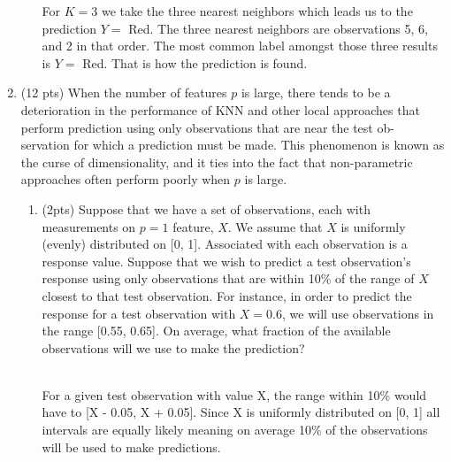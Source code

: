 \documentclass[a4paper]{article}
\theoremstyle{definition}
\newenvironment{soln}{
    \leavevmode\color{blue}\ignorespaces
}{}
\begin{document}
\begin{enumerate}
\begin{enumerate}
	\begin{soln}
            For $K = 3$ we take the three nearest neighbors which leads us to the prediction $Y =$ Red. The three nearest neighbors are observations 5, 6, and 2 in that order. The most common label amongst those three results is $Y =$ Red. That is how the prediction is found.
        \end{soln}\\

\end{enumerate}

\item (12 pts) When the number of features $p$ is large, there tends to be a deterioration in the performance of KNN and other local approaches that perform prediction using only observations that are near the test ob- servation for which a prediction must be made. This phenomenon is known as the curse of dimensionality, and it ties into the fact that non-parametric approaches often perform poorly when $p$ is large.

\begin{enumerate}
	\item (2pts) Suppose that we have a set of observations, each with measurements on $p=1$ feature, $X$. We assume that $X$ is uniformly (evenly) distributed on [0, 1]. Associated with each observation is a response value. Suppose that we wish to predict a test observation’s response using only observations that are within 10\% of the range of $X$ closest to that test observation. For instance, in order to predict the response for a test observation with $X=0.6$, we will use observations in the range [0.55, 0.65]. On average, what fraction of the available observations will we use to make the prediction?
	\\\\
	\begin{soln}
            For a given test observation with value X, the range within 10\% would have to [X - 0.05, X + 0.05]. Since X is uniformly distributed on [0, 1] all intervals are equally likely meaning on average 10\% of the observations will be used to make predictions.
        \end{soln}\\
	

\end{enumerate}
\end{enumerate}
\end{document}
